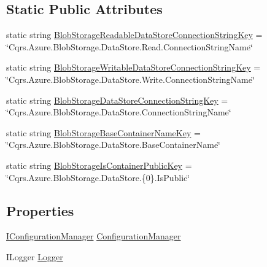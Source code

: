 \subsection*{Static Public Attributes}
\begin{DoxyCompactItemize}
\item 
static string \hyperlink{classCqrs_1_1Azure_1_1BlobStorage_1_1DataStores_1_1BlobStorageDataStoreConnectionStringFactory_a2f05e93dc8fced32c8526f87d02ee714}{Blob\+Storage\+Readable\+Data\+Store\+Connection\+String\+Key} = \char`\"{}Cqrs.\+Azure.\+Blob\+Storage.\+Data\+Store.\+Read.\+Connection\+String\+Name\char`\"{}
\item 
static string \hyperlink{classCqrs_1_1Azure_1_1BlobStorage_1_1DataStores_1_1BlobStorageDataStoreConnectionStringFactory_ac1612324a23917f112006ad175d16711}{Blob\+Storage\+Writable\+Data\+Store\+Connection\+String\+Key} = \char`\"{}Cqrs.\+Azure.\+Blob\+Storage.\+Data\+Store.\+Write.\+Connection\+String\+Name\char`\"{}
\item 
static string \hyperlink{classCqrs_1_1Azure_1_1BlobStorage_1_1DataStores_1_1BlobStorageDataStoreConnectionStringFactory_ade860ef3ef2a7b09b90bd2188e4fcf31}{Blob\+Storage\+Data\+Store\+Connection\+String\+Key} = \char`\"{}Cqrs.\+Azure.\+Blob\+Storage.\+Data\+Store.\+Connection\+String\+Name\char`\"{}
\item 
static string \hyperlink{classCqrs_1_1Azure_1_1BlobStorage_1_1DataStores_1_1BlobStorageDataStoreConnectionStringFactory_a591fca7ea03045cc3c9e23a8f807d2d6}{Blob\+Storage\+Base\+Container\+Name\+Key} = \char`\"{}Cqrs.\+Azure.\+Blob\+Storage.\+Data\+Store.\+Base\+Container\+Name\char`\"{}
\item 
static string \hyperlink{classCqrs_1_1Azure_1_1BlobStorage_1_1DataStores_1_1BlobStorageDataStoreConnectionStringFactory_ab94cd062689d85c041476e67b57f4d7f}{Blob\+Storage\+Is\+Container\+Public\+Key} = \char`\"{}Cqrs.\+Azure.\+Blob\+Storage.\+Data\+Store.\{0\}.Is\+Public\char`\"{}
\end{DoxyCompactItemize}
\subsection*{Properties}
\begin{DoxyCompactItemize}
\item 
\hyperlink{interfaceCqrs_1_1Configuration_1_1IConfigurationManager}{I\+Configuration\+Manager} \hyperlink{classCqrs_1_1Azure_1_1BlobStorage_1_1DataStores_1_1BlobStorageDataStoreConnectionStringFactory_a302ecb39a13da3a3c3ac183a480cb606}{Configuration\+Manager}
\item 
I\+Logger \hyperlink{classCqrs_1_1Azure_1_1BlobStorage_1_1DataStores_1_1BlobStorageDataStoreConnectionStringFactory_a4a678d2419de2027e835d8e4f106134f}{Logger}
\end{DoxyCompactItemize}


